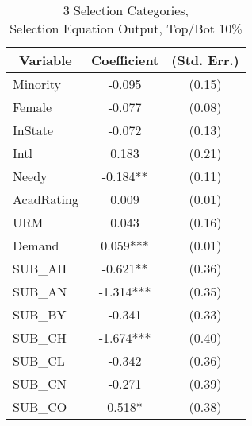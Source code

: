 \clearpage{}

\newpage{}

\begin{table}[htb]\centering
  \begin{threeparttable}
    \caption{3 Selection Categories, \\Selection Equation Output, Top/Bot 10\%}\label{table:b6}
    \begin{tabular}{l c c}
      \hline\hline 
      \multicolumn{1}{c}{\textbf{Variable}} & {\textbf{Coefficient}} & \textbf{(Std. Err.)} \\ 
      \hline
      \hline 
      Minority                              & -0.095                 & (0.15)               \\
      Female                                & -0.077                 & (0.08)               \\
      InState                                    & -0.072                 & (0.13)               \\
      Intl                                  & 0.183                  & (0.21)               \\
      Needy                                 & -0.184**               & (0.11)               \\
      AcadRating                            & 0.009                  & (0.01)               \\
      URM                                   & 0.043                  & (0.16)               \\
      Demand                                & 0.059***               & (0.01)               \\
      SUB\_AH                               & -0.621**               & (0.36)               \\
      SUB\_AN                               & -1.314***              & (0.35)               \\
      SUB\_BY                               & -0.341                 & (0.33)               \\
      SUB\_CH                               & -1.674***              & (0.40)               \\
      SUB\_CL                               & -0.342                 & (0.36)               \\
      SUB\_CN                               & -0.271                 & (0.39)               \\
      SUB\_CO                               & 0.518*                 & (0.38)               \\

\end{tabular}
\end{threeparttable}
\end{table}
